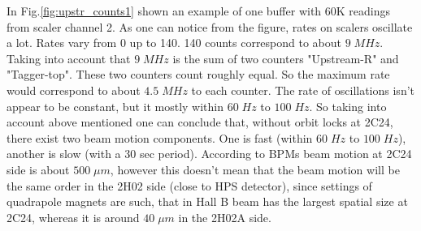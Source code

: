 \documentclass[letterpaper,12pt]{article}
\begin{document}
 In Fig.\ref{fig:upstr_counts1} shown an example of one buffer with 60K readings from scaler channel 2.
 As one can notice from the figure, rates on scalers oscillate a lot. Rates vary from 0 up to 140. 
 140 counts correspond to about $9\;MHz$. Taking into account that $9\;MHz$ is the sum of two counters
"Upstream-R" and "Tagger-top". These two counters count roughly equal. So the maximum rate would correspond
to about $4.5\;MHz$ to each counter. 
The rate of oscillations isn't appear to be constant, but it mostly within $60\;Hz$ to $100\;Hz$.
So taking into account above mentioned one can conclude that, without orbit locks at 2C24, there
exist two beam motion components. One is fast (within $60\;Hz$ to $100\;Hz$), another
is slow (with a 30 sec period). According to BPMs beam motion at 2C24 side is about $500\; \mu m$,
however this doesn't mean that the beam motion will be the same order in the 2H02 side (close to HPS detector),
since settings of quadrapole magnets are such, that in Hall B beam has the largest spatial size at 2C24,
whereas it is around $40\; \mu m$ in the 2H02A side.
\end{document}
